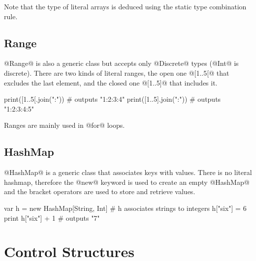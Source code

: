 Note that the type of literal arrays is deduced using the static type combination rule.

\subsection{Range}\label{Range}

@Range@ is also a generic class but accepts only @Discrete@ types (@Int@ is discrete).
There are two kinds of literal ranges, the open one @[1..5[@ that excludes the last element, and the closed one @[1..5]@ that includes it.

\begin{lst}
print([1..5[.join(":")) # outputs "1:2:3:4"
print([1..5].join(":")) # outputs "1:2:3:4:5"
\end{lst}

Ranges are mainly used in @for@ loops.

\subsection{HashMap}\label{HashMap}

@HashMap@ is a generic class that associates keys with values.
There is no literal hashmap, therefore the @new@ keyword is used to create an empty @HashMap@ and the bracket operators are used to store and retrieve values.

\begin{lst}
var h = new HashMap[String, Int] 
# h associates strings to integers
h["six"] = 6
print h["six"] + 1 # outputs "7"
\end{lst}

\section{Control Structures}\label{control}

